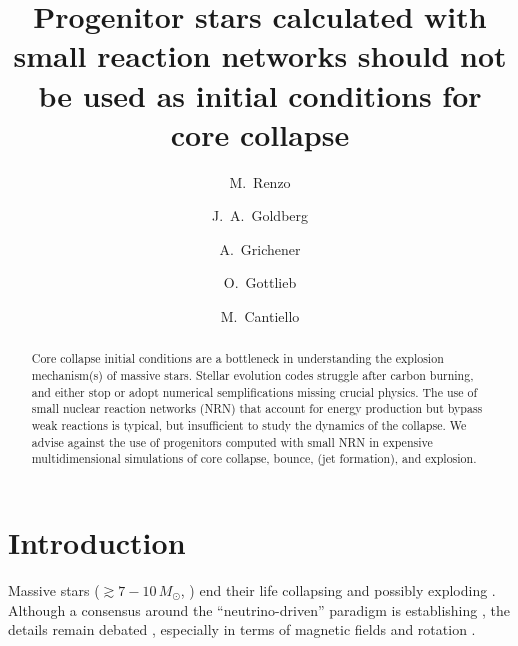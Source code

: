 \documentclass[twocolumn]{aastex63}
\begin{document}
\title{Progenitor stars calculated with small reaction networks
  should not be used as initial conditions for core collapse}

\author[0000-0002-6718-9472]{M.~Renzo}

\author[0000-0003-1012-3031]{J.~A.~Goldberg}

\author[0000-0002-2215-1841]{A.~Grichener}

\author[0000-0003-3115-2456]{O.~Gottlieb}

\author[0000-0002-8171-8596]{M.~Cantiello}

\begin{abstract}
  \noindent
  Core collapse initial conditions are a bottleneck in understanding
  the explosion mechanism(s) of massive stars. Stellar evolution codes
  struggle after carbon burning, and either stop or adopt numerical
  semplifications missing crucial physics. The use of small nuclear
  reaction networks (NRN) that account for energy production but
  bypass weak reactions is typical, but insufficient to study the
  dynamics of the collapse. We advise against the use of progenitors
  computed with small NRN in expensive multidimensional simulations of
  core collapse, bounce, (jet formation), and explosion.
\end{abstract}

\section{Introduction}

Massive stars ($\gtrsim 7-10\,M_\odot$, \citealt{doherty:15,
  poelarends:17}) end their life collapsing and possibly exploding
\citep[e.g.,][]{janka:12, burrows:21, soker:24}. Although a consensus
around the ``neutrino-driven'' paradigm is establishing
\citep[e.g.,][]{wang:23, nakamura:24}, the details remain debated
\citep[e.g.,][]{shishkin:22, soker:22}, especially in terms of magnetic
fields and rotation \citep[e.g.,][]{symbalisty:84, mosta:15, aloy:21}.
\end{document}
